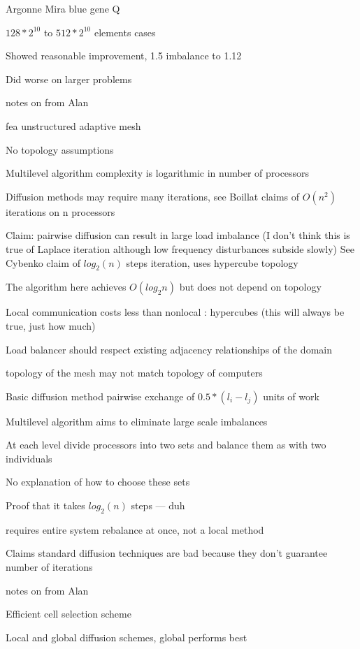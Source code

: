 \documentclass{article}
\begin{document}
Argonne Mira blue gene Q

$128*2^{10}$ to $512*2^{10}$ elements cases

Showed reasonable improvement, 1.5 imbalance to 1.12

Did worse on larger problems


\medskip

notes on \cite{HORTON1993209}
from Alan

fea unstructured adaptive mesh

No topology assumptions

Multilevel algorithm complexity is logarithmic in number of processors

Diffusion methods may require many iterations, see Boillat claims of $O(n^2)$ iterations on n processors

Claim: pairwise diffusion can result in large load imbalance (I don’t think this is true of Laplace iteration although low frequency disturbances subside slowly)
See Cybenko claim of $log_2(n)$ steps iteration, uses hypercube topology

The algorithm here achieves $O(log_2 n)$ but does not depend on topology

Local communication costs less than nonlocal : hypercubes (this will always be true, just how much)

Load balancer should respect existing adjacency relationships of the domain

topology of the mesh may not match topology of computers

Basic diffusion method pairwise exchange of $0.5*(l_i - l_j)$ units of work

Multilevel algorithm aims to eliminate large scale imbalances

At each level divide processors into two sets and balance them as with two individuals

No explanation of how to choose these sets

Proof that it takes $log_2(n)$ steps — duh

requires entire system rebalance at once, not a local method

Claims standard diffusion techniques are bad because they don’t guarantee number of iterations


\medskip

notes on
\cite{Deng:2010:HDB:1889863.1889910}
from Alan

Efficient cell selection scheme

Local and global diffusion schemes, global performs best
\end{document}
